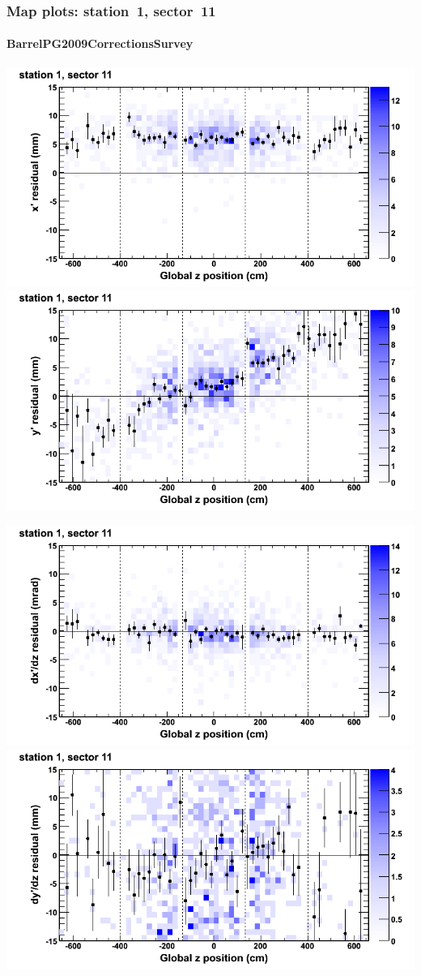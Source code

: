 \documentclass[compress]{beamer}
\begin{document}
\begin{frame}
\frametitle{Map plots: station~1, sector~11}
\framesubtitle{BarrelPG2009CorrectionsSurvey}
\includegraphics[width=0.5\linewidth]{mapplots_01/DTvsz_st1sec11_x.png}
\includegraphics[width=0.5\linewidth]{mapplots_01/DTvsz_st1sec11_y.png}

\includegraphics[width=0.5\linewidth]{mapplots_01/DTvsz_st1sec11_dxdz.png}
\includegraphics[width=0.5\linewidth]{mapplots_01/DTvsz_st1sec11_dydz.png}
\end{frame}
\end{document}

